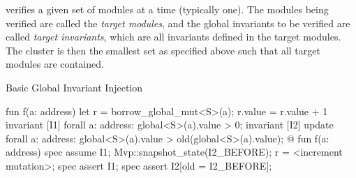 \MVP verifies a given set of modules at a time (typically one).  The modules
being verified are called the \textit{target modules}, and the global invariants
to be verified are called \textit{target invariants}, which are all invariants
defined in the target modules. The cluster is then the smallest set as specified
above such that all target modules are contained.


\begin{Figure}
  \caption{Basic Global Invariant Injection}
  \label{fig:GlobalInvariants}
  \centering
\begin{MoveBox}
  fun f(a: address) {
    let r = borrow_global_mut<S>(a);
    r.value = r.value + 1
  }
  invariant [I1] forall a: address: global<S>(a).value > 0;
  invariant [I2] update forall a: address:
      global<S>(a).value > old(global<S>(a).value);
  @\transform@
  fun f(a: address) {
    spec assume I1;
    Mvp::snapshot_state(I2_BEFORE);
    r = <increment mutation>;
    spec assert I1;
    spec assert I2[old = I2_BEFORE];
  }
\end{MoveBox}
\end{Figure}




